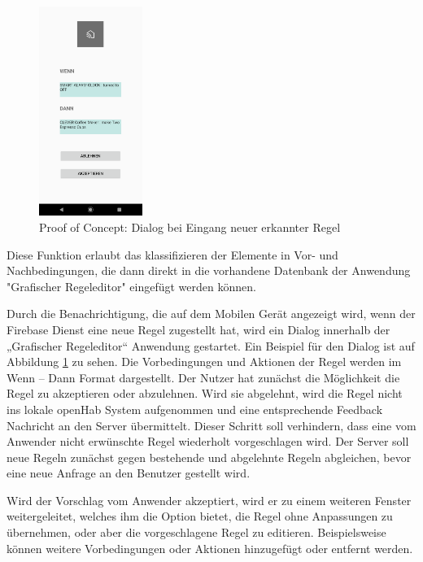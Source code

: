 \begin{figure}
  \begin{center}
    \includegraphics[width=0.3\textwidth]{figures/Appbildungen/newRuleDialog.png}
  \end{center}
  
  \caption{Proof of Concept: Dialog bei Eingang neuer erkannter Regel}\label{fig:dialog}
\end{figure}
\normalsize

Diese Funktion erlaubt das klassifizieren der Elemente in Vor- und Nachbedingungen, die dann direkt in die vorhandene Datenbank der Anwendung "Grafischer Regeleditor" eingefügt werden können.

Durch die Benachrichtigung, die auf dem Mobilen Gerät angezeigt wird, wenn der Firebase Dienst eine neue Regel zugestellt hat, wird ein Dialog innerhalb der „Grafischer Regeleditor“ Anwendung gestartet. Ein Beispiel für den Dialog ist auf Abbildung \ref{fig:dialog} zu sehen. Die Vorbedingungen und Aktionen der Regel werden im Wenn – Dann Format dargestellt. Der Nutzer hat zunächst die Möglichkeit die Regel zu akzeptieren oder abzulehnen. Wird sie abgelehnt, wird die Regel nicht ins lokale openHab System aufgenommen und eine entsprechende Feedback Nachricht an den Server übermittelt. Dieser Schritt soll verhindern, dass eine vom Anwender nicht erwünschte Regel wiederholt vorgeschlagen wird. Der Server soll neue Regeln zunächst gegen bestehende und abgelehnte Regeln abgleichen, bevor eine neue Anfrage an den Benutzer gestellt wird.

Wird der Vorschlag vom Anwender akzeptiert, wird er zu einem weiteren Fenster weitergeleitet, welches ihm die Option bietet, die Regel ohne Anpassungen zu übernehmen, oder aber die vorgeschlagene Regel zu editieren. Beispielsweise können weitere Vorbedingungen oder Aktionen hinzugefügt oder entfernt werden. 


